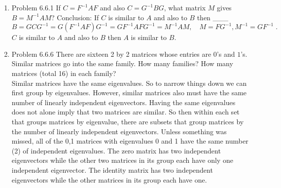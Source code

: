\documentclass[a4paper]{article}
\begin{document}
\begin{enumerate}
\item{Problem 6.6.1} If $C = F^{-1} AF$ and also $C = G^{-1} BG$, what matrix $M$ gives $B = M^{-1} AM$? 
Conclusion: If $C$ is similar to $A$ and also to $B$ then \_\_\_ 
$$
B = GCG^{-1} = G(F^{-1}AF)G^{-1} = GF^{-1}AFG^{-1} = M^{-1}AM, \quad \boxed{M = FG^{-1}, M^{-1} = GF^{-1}} \;.
$$
$C$ is similar to $A$ and also to $B$ then $A$ is similar to $B$.

\item{Problem 6.6.6} There are sixteen 2 by 2 matrices whose entries are $0$'s and $1$'s. Similar matrices go 
into the same family. How many families? How many matrices (total 16) in each family?\\

Similar matrices have the same eigenvalues. So to narrow things down we can first group by eigenvalues. However, similar matrices also must have the same number of linearly independent eigenvectors. Having the same eigenvalues does not alone imply that two matrices are similar. So then within each set that groups matrices by eigenvalue, there are subsets that group matrices by the number of linearly independent eigenvectors. Unless something was missed, all of the 0,1 matrices with eigenvalues 0 and 1 have the same number (2) of independent eigenvalues. The zero matrix has two independent eigenvectors while the other two matrices in its group each have only one independent eigenvector. The identity matrix has two independent eigenvectors while the other matrices in its group each have one.


\end{enumerate}
\end{document}
